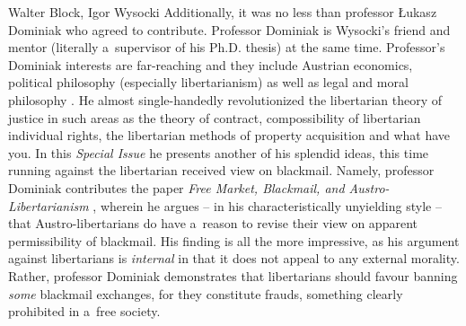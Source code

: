 \begin{editorialeng}{Walter Block, Igor Wysocki}
Additionally, it was no less than professor Łukasz Dominiak who agreed to contribute. Professor Dominiak is Wysocki's friend and mentor (literally a~supervisor of his Ph.D. thesis) at the same time. Professor's Dominiak interests are far-reaching and they include Austrian economics, political philosophy (especially libertarianism) as well as legal and moral philosophy 
\parencites[][]{dominiak_libertarianism_2017}[][]{dominiak_must_2019}[][]{dominiak_contract_2022}. %
 He almost single-handedly revolutionized the libertarian theory of justice in such areas as the theory of contract, compossibility of libertarian individual rights, the libertarian methods of property acquisition and what have you. In this \textit{Special Issue} he presents another of his splendid ideas, this time running against the libertarian received view on blackmail. Namely, professor Dominiak contributes the paper \textit{Free Market, Blackmail, and Austro-Libertarianism} 
\parencite*[][]{dominiak_free_2024}, %
 wherein he argues -- in his characteristically unyielding style -- that Austro-libertarians do have a~reason to revise their view on apparent permissibility of blackmail. His finding is all the more impressive, as his argument against libertarians is \textit{internal} in that it does not appeal to any external morality. Rather, professor Dominiak demonstrates that libertarians should favour banning \textit{some} blackmail exchanges, for they constitute frauds, something clearly prohibited in a~free society.




\end{editorialeng}
